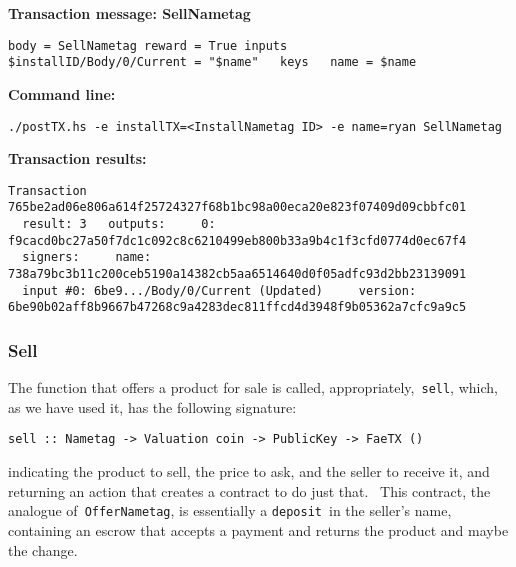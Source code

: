 \documentclass[11pt]{article}
\newcommand{\codeblock}[1]{\begin{mdframed}[
    backgroundcolor=header-color,
    linecolor=header-color,
    innertopmargin=10pt,
    ]{\texttt{#1}}\end{mdframed}}
\begin{document}
\textbf{Transaction message: SellNametag}

\codeblock{body = SellNametag\newline
reward = True\newline
inputs\newline
  \$installID\slash{}Body\slash{}0\slash{}Current = "\$name"  \newline
keys\newline
  name = \$name}

\textbf{Command line:}

\codeblock{.\slash{}postTX.hs -e installTX=\textless{}InstallNametag ID\textgreater{} -e name=ryan SellNametag}

\textbf{Transaction results:}

\codeblock{Transaction 765be2ad06e806a614f25724327f68b1bc98a00eca20e823f07409d09cbbfc01\newline
  result: 3\newline
  outputs:\newline
    0: f9cacd0bc27a50f7dc1c092c8c6210499eb800b33a9b4c1f3cfd0774d0ec67f4\newline
  signers:\newline
    name: 738a79bc3b11c200ceb5190a14382cb5aa6514640d0f05adfc93d2bb23139091\newline
  input \#0: 6be9...\slash{}Body\slash{}0\slash{}Current (Updated)\newline
    version: 6be90b02aff8b9667b47268c9a4283dec811ffcd4d3948f9b05362a7cfc9a9c5}

\subsubsection{Sell}
\vspace{5.5pt}

The function that offers a product for sale is called, appropriately, \texttt{sell}, which, as we have used it, has the following signature:

\codeblock{sell :: Nametag -\textgreater{} Valuation coin -\textgreater{} PublicKey -\textgreater{} FaeTX ()}

indicating the product to sell, the price to ask, and the seller to receive it, and returning an action that creates a contract to do just that.  This contract, the analogue of \texttt{OfferNametag}, is essentially a \texttt{deposit} in the seller's name, containing an escrow that accepts a payment and returns the product and maybe the change.
\end{document}
